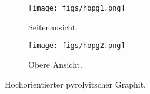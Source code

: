 \begin{figure}[htb]
	\centering
	\begin{subfigure}{0.45\linewidth}
		\texttt{[image: figs/hopg1.png]}
		\caption{Seitenansicht.\cite[S.49]{skript}}
		\label{fig:hopg1}
	\end{subfigure}
	\hspace{0.5cm}
	\begin{subfigure}{0.45\linewidth}
		\texttt{[image: figs/hopg2.png]}
		\caption{Obere Ansicht.\cite[Kap.1 S.17]{rtm-leitpfaden}}
		\label{fig:hopg2}
	\end{subfigure}
	\caption{Hochorientierter pyrolyitscher Graphit.}
	\label{fig:hopg-skizze}
\end{figure}